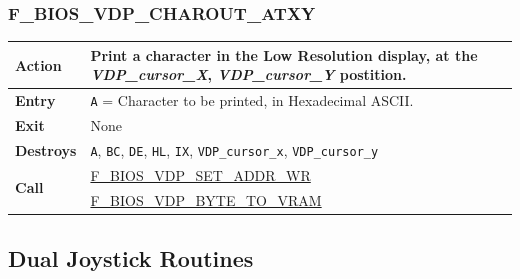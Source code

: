 \documentclass[a4paper,11pt]{article}
\begin{document}
        \subsubsection{F\_BIOS\_VDP\_CHAROUT\_ATXY}
        \label{func:fbiosvdpcharoutatxy}
        \begin{tabular}{l p{9cm}}
            \hline\textbf{Action}
            & Print a character in the \textbf{Low Resolution display}, at the
            \textit{VDP\_cursor\_X}, \textit{VDP\_cursor\_Y} postition.\\
            \hline\textbf{Entry} & \texttt{A} = Character to be printed, in
            Hexadecimal ASCII.\\
            \hline\textbf{Exit} & None\\
            \hline\textbf{Destroys} & \texttt{A}, \texttt{BC}, \texttt{DE},
            \texttt{HL}, \texttt{IX}, \texttt{VDP\_cursor\_x},
            \texttt{VDP\_cursor\_y}\\
            \hline\multirow[t]{2}{4em}{\textbf{Call}}
            & \hyperref[func:fbiosvdpsetaddrwr]{F\_BIOS\_VDP\_SET\_ADDR\_WR}\\
            & \hyperref[func:fbiosvdpbytetovram]{F\_BIOS\_VDP\_BYTE\_TO\_VRAM}\\
            \hline
        \end{tabular}

    \subsection{Dual Joystick Routines}

\end{document}
